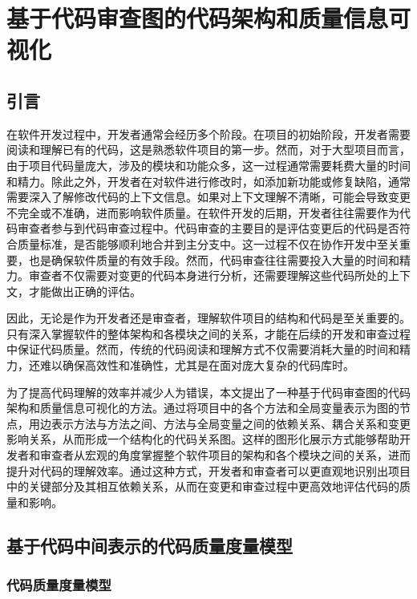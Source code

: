 \chapter{基于代码审查图的代码架构和质量信息可视化}
\section{引言}


在软件开发过程中，开发者通常会经历多个阶段。在项目的初始阶段，开发者需要阅读和理解已有的代码，这是熟悉软件项目的第一步。然而，对于大型项目而言，由于项目代码量庞大，涉及的模块和功能众多，这一过程通常需要耗费大量的时间和精力。除此之外，开发者在对软件进行修改时，如添加新功能或修复缺陷，通常需要深入了解修改代码的上下文信息。如果对上下文理解不清晰，可能会导致变更不完全或不准确，进而影响软件质量。在软件开发的后期，开发者往往需要作为代码审查者参与到代码审查过程中。代码审查的主要目的是评估变更后的代码是否符合质量标准，是否能够顺利地合并到主分支中。这一过程不仅在协作开发中至关重要，也是确保软件质量的有效手段。然而，代码审查往往需要投入大量的时间和精力\cite{花子涵2024代码审查自动化研究综述}。审查者不仅需要对变更的代码本身进行分析，还需要理解这些代码所处的上下文，才能做出正确的评估。

因此，无论是作为开发者还是审查者，理解软件项目的结构和代码是至关重要的。只有深入掌握软件的整体架构和各模块之间的关系，才能在后续的开发和审查过程中保证代码质量。然而，传统的代码阅读和理解方式不仅需要消耗大量的时间和精力，还难以确保高效性和准确性，尤其是在面对庞大复杂的代码库时。

为了提高代码理解的效率并减少人为错误，本文提出了一种基于代码审查图的代码架构和质量信息可视化的方法。通过将项目中的各个方法和全局变量表示为图的节点，用边表示方法与方法之间、方法与全局变量之间的依赖关系、耦合关系和变更影响关系，从而形成一个结构化的代码关系图。这样的图形化展示方式能够帮助开发者和审查者从宏观的角度掌握整个软件项目的架构和各个模块之间的关系，进而提升对代码的理解效率。通过这种方式，开发者和审查者可以更直观地识别出项目中的关键部分及其相互依赖关系，从而在变更和审查过程中更高效地评估代码的质量和影响。

\section{基于代码中间表示的代码质量度量模型}

\subsection{代码质量度量模型}

